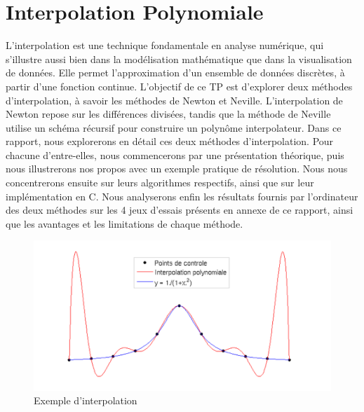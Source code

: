 \chapter{Interpolation Polynomiale}
L'interpolation est une technique fondamentale en analyse numérique, qui s'illustre aussi bien dans la modélisation mathématique que dans la visualisation de données. Elle permet l'approximation d'un ensemble de données discrètes, à partir d'une fonction continue. L'objectif de ce TP est d'explorer deux méthodes d'interpolation, à savoir les méthodes de Newton et Neville. L'interpolation de Newton repose sur les différences divisées, tandis que la méthode de Neville utilise un schéma récursif pour construire un polynôme interpolateur. 
Dans ce rapport, nous explorerons en détail ces deux méthodes d'interpolation. Pour chacune d'entre-elles, nous commencerons par une présentation théorique, puis nous illustrerons nos propos avec un exemple pratique de résolution. Nous nous concentrerons ensuite sur leurs algorithmes respectifs, ainsi que sur leur implémentation en C. Nous analyserons enfin les résultats fournis par l'ordinateur des deux méthodes sur les 4 jeux d'essais présents en annexe de ce rapport, ainsi que les avantages et les limitations de chaque méthode.
\begin{figure}[h]
    \centering
    \includegraphics[width=1\textwidth]{chapter/interpolation.png}
    \caption{Exemple d'interpolation}
\end{figure}
\newpage
